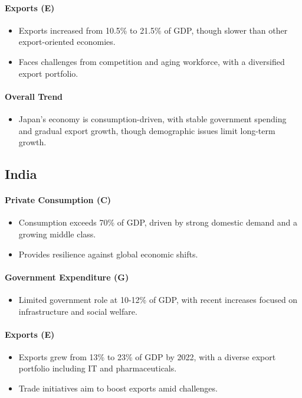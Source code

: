 \documentclass[a4paper,12pt]{extarticle} %
\begin{document}
\paragraph{Exports (E)}
\begin{itemize}
    \item Exports increased from 10.5\% to 21.5\% of GDP, though slower than other export-oriented economies.
    \item Faces challenges from competition and aging workforce, with a diversified export portfolio.
\end{itemize}

\paragraph{Overall Trend}
\begin{itemize}
    \item Japan’s economy is consumption-driven, with stable government spending and gradual export growth, though demographic issues limit long-term growth.
\end{itemize}

\subsection{India}

\paragraph{Private Consumption (C)}
\begin{itemize}
    \item Consumption exceeds 70\% of GDP, driven by strong domestic demand and a growing middle class.
    \item Provides resilience against global economic shifts.
\end{itemize}

\paragraph{Government Expenditure (G)}
\begin{itemize}
    \item Limited government role at 10-12\% of GDP, with recent increases focused on infrastructure and social welfare.
\end{itemize}

\paragraph{Exports (E)}
\begin{itemize}
    \item Exports grew from 13\% to 23\% of GDP by 2022, with a diverse export portfolio including IT and pharmaceuticals.
    \item Trade initiatives aim to boost exports amid challenges.
\end{itemize}
\end{document}
